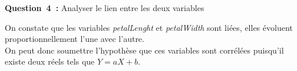 \vspace{.5cm}


\noindent
\textbf{Question~4~:} Analyser le lien entre les deux variables
\vspace{.2cm}

On constate que les variables \textit{petalLenght} et \textit{petalWidth} sont liées, elles évoluent proportionnellement l'une avec l'autre. \\
On peut donc soumettre l'hypothèse que ces variables sont corrélées puisqu'il existe deux réels tels que $Y=aX+b$.

\vspace{.3cm}

